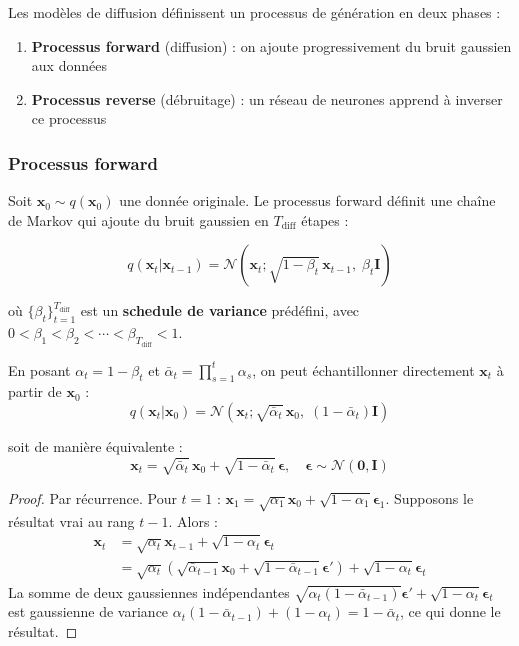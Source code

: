 \documentclass[12pt,a4paper]{article}
\newcounter{propctr}[section]
\renewcommand{\thepropctr}{\thesection.\arabic{propctr}}
\newenvironment{proposition}[1][]
  {\refstepcounter{propctr}\begin{tcolorbox}[propstyle,title={Proposition~\thepropctr\if\relax\detokenize{#1}\relax\else~--- #1\fi}]}
  {\end{tcolorbox}}
\newcommand{\N}{\mathcal{N}}
\newcommand{\bx}{\bm{x}}
\newcommand{\beps}{\bm{\epsilon}}
\begin{document}
Les mod\`eles de diffusion \cite{ho2020,sohl2015} d\'efinissent un processus de g\'en\'eration en deux phases :

\begin{enumerate}
    \item \textbf{Processus forward} (diffusion) : on ajoute progressivement du bruit gaussien aux donn\'ees
    \item \textbf{Processus reverse} (d\'ebruitage) : un r\'eseau de neurones apprend \`a inverser ce processus
\end{enumerate}

\subsubsection{Processus forward}

Soit $\bx_0 \sim q(\bx_0)$ une donn\'ee originale. Le processus forward d\'efinit une cha\^ine de Markov qui ajoute du bruit gaussien en $T_{\text{diff}}$ \'etapes :

\begin{equation}
\boxed{q(\bx_t | \bx_{t-1}) = \N\left(\bx_t ; \sqrt{1 - \beta_t}\, \bx_{t-1},\; \beta_t \bm{I}\right)}
\label{eq:forward_step}
\end{equation}

o\`u $\{\beta_t\}_{t=1}^{T_{\text{diff}}}$ est un \textbf{schedule de variance} pr\'ed\'efini, avec $0 < \beta_1 < \beta_2 < \cdots < \beta_{T_{\text{diff}}} < 1$.

\begin{proposition}[Formule en une \'etape]
En posant $\alpha_t = 1 - \beta_t$ et $\bar{\alpha}_t = \prod_{s=1}^{t} \alpha_s$, on peut \'echantillonner directement $\bx_t$ \`a partir de $\bx_0$ :
\begin{equation}
\boxed{q(\bx_t | \bx_0) = \N\left(\bx_t ; \sqrt{\bar{\alpha}_t}\, \bx_0,\; (1 - \bar{\alpha}_t) \bm{I}\right)}
\label{eq:forward_closed}
\end{equation}

soit de mani\`ere \'equivalente :
\begin{equation}
\bx_t = \sqrt{\bar{\alpha}_t}\, \bx_0 + \sqrt{1 - \bar{\alpha}_t}\, \beps, \quad \beps \sim \N(\bm{0}, \bm{I})
\label{eq:reparametrization}
\end{equation}
\end{proposition}

\begin{proof}
Par r\'ecurrence. Pour $t=1$ : $\bx_1 = \sqrt{\alpha_1}\bx_0 + \sqrt{1-\alpha_1}\beps_1$. Supposons le r\'esultat vrai au rang $t-1$. Alors :
\begin{align}
\bx_t &= \sqrt{\alpha_t}\bx_{t-1} + \sqrt{1-\alpha_t}\beps_t \\
&= \sqrt{\alpha_t}\left(\sqrt{\bar{\alpha}_{t-1}}\bx_0 + \sqrt{1-\bar{\alpha}_{t-1}}\beps'\right) + \sqrt{1-\alpha_t}\beps_t
\end{align}
La somme de deux gaussiennes ind\'ependantes $\sqrt{\alpha_t(1-\bar{\alpha}_{t-1})}\beps' + \sqrt{1-\alpha_t}\beps_t$ est gaussienne de variance $\alpha_t(1-\bar{\alpha}_{t-1}) + (1-\alpha_t) = 1 - \bar{\alpha}_t$, ce qui donne le r\'esultat.
\end{proof}
\end{document}
